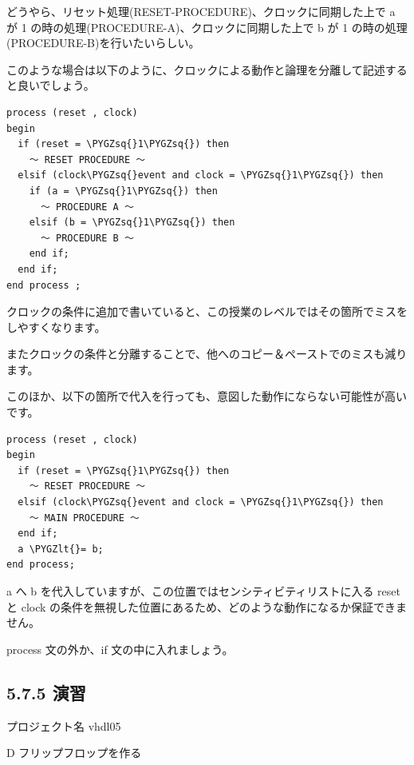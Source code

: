 \documentclass[letterpaper,10pt,dvipdfmx]{sphinxmanual}
\def\PYGZlt{\char`\<}
\def\PYGZsq{\char`\'}
\renewcommand\PYGZsq{\textquotesingle}
\begin{document}
どうやら、リセット処理(RESET-PROCEDURE)、クロックに同期した上で a が 1 の時の処理(PROCEDURE-A)、クロックに同期した上で b が 1 の時の処理(PROCEDURE-B)を行いたいらしい。

このような場合は以下のように、クロックによる動作と論理を分離して記述すると良いでしょう。

\begin{Verbatim}[commandchars=\\\{\}]
process (reset , clock)
begin
  if (reset = \PYGZsq{}1\PYGZsq{}) then
    ～ RESET PROCEDURE ～
  elsif (clock\PYGZsq{}event and clock = \PYGZsq{}1\PYGZsq{}) then
    if (a = \PYGZsq{}1\PYGZsq{}) then
      ～ PROCEDURE A ～
    elsif (b = \PYGZsq{}1\PYGZsq{}) then
      ～ PROCEDURE B ～
    end if;
  end if;
end process ;
\end{Verbatim}

クロックの条件に追加で書いていると、この授業のレベルではその箇所でミスをしやすくなります。

またクロックの条件と分離することで、他へのコピー＆ペーストでのミスも減ります。

このほか、以下の箇所で代入を行っても、意図した動作にならない可能性が高いです。

\begin{Verbatim}[commandchars=\\\{\}]
process (reset , clock)
begin
  if (reset = \PYGZsq{}1\PYGZsq{}) then
    ～ RESET PROCEDURE ～
  elsif (clock\PYGZsq{}event and clock = \PYGZsq{}1\PYGZsq{}) then
    ～ MAIN PROCEDURE ～
  end if;
  a \PYGZlt{}= b;
end process;
\end{Verbatim}

a へ b を代入していますが、この位置ではセンシティビティリストに入る reset と clock の条件を無視した位置にあるため、どのような動作になるか保証できません。

process 文の外か、if 文の中に入れましょう。


\subsection{5.7.5 演習}
\label{05_try:id12}
プロジェクト名 vhdl05

D フリップフロップを作る
\end{document}
